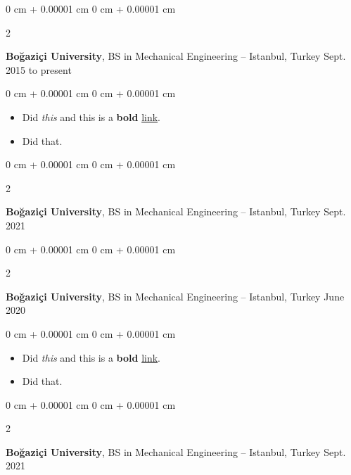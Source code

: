 \documentclass[10pt, letterpaper]{article}
\newenvironment{highlights}{
    \begin{itemize}[
        topsep=0.10 cm,
        parsep=0.10 cm,
        partopsep=0pt,
        itemsep=0pt,
        leftmargin=0 cm + 10pt
    ]
}{
    \end{itemize}
        
    \vspace{-0.10cm}
} %
\newenvironment{onecolentry}{
    \begin{adjustwidth}{
        0 cm + 0.00001 cm
    }{
        0 cm + 0.00001 cm
    }
}{
    \end{adjustwidth}
} %
\newenvironment{twocolentry}[2][]{
    \onecolentry
    \def\secondColumn{#2}
    \setcolumnwidth{\fill, 4.1 cm}
    \begin{paracol}{2}
}{
    \switchcolumn \raggedleft \secondColumn
    \end{paracol}
    \endonecolentry
} %
\begin{document}
        \begin{twocolentry}{
            Sept. 2015 to present
        }
            \textbf{Boğaziçi University}, BS in Mechanical Engineering -- Istanbul, Turkey\end{twocolentry}

        \vspace{0.10 cm}
        \begin{onecolentry}
            \begin{highlights}
                \item Did \textit{this} and this is a \textbf{bold} \href{https://example.com}{link}.
                \item Did that.
            \end{highlights}
        \end{onecolentry}


        \vspace{0.15 cm}

        \begin{twocolentry}{
            Sept. 2021
        }
            \textbf{Boğaziçi University}, BS in Mechanical Engineering -- Istanbul, Turkey\end{twocolentry}

        \vspace{0.10 cm}


        \vspace{0.15 cm}

        \begin{twocolentry}{
            June 2020
        }
            \textbf{Boğaziçi University}, BS in Mechanical Engineering -- Istanbul, Turkey\end{twocolentry}

        \vspace{0.10 cm}
        \begin{onecolentry}
            \begin{highlights}
                \item Did \textit{this} and this is a \textbf{bold} \href{https://example.com}{link}.
                \item Did that.
            \end{highlights}
        \end{onecolentry}


        \vspace{0.15 cm}

        \begin{twocolentry}{
            Sept. 2021
        }
            \textbf{Boğaziçi University}, BS in Mechanical Engineering -- Istanbul, Turkey\end{twocolentry}
\end{document}
